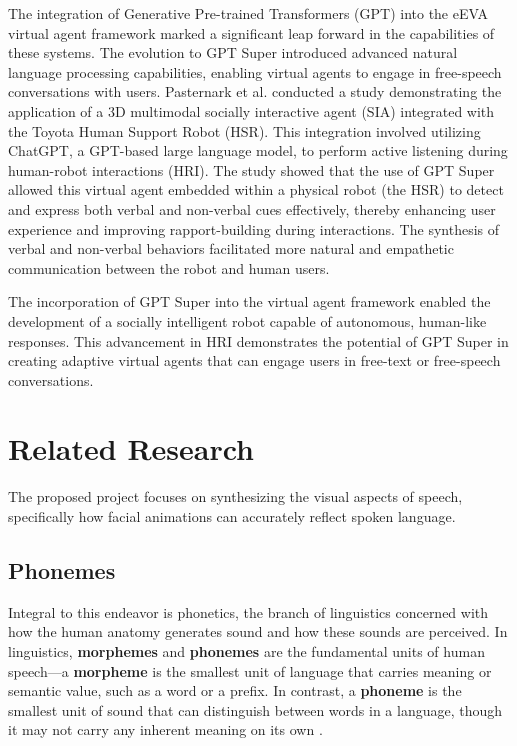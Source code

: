 \documentclass[12pt]{article}
\begin{document}
The integration of Generative Pre-trained Transformers (GPT) into the eEVA virtual agent framework marked a significant leap forward in the capabilities of these systems. The evolution to GPT Super introduced advanced natural language processing capabilities, enabling virtual agents to engage in free-speech conversations with users.  Pasternark et al. \cite{Pasternak20243DListening} conducted a study demonstrating the application of a 3D multimodal socially interactive agent (SIA) integrated with the Toyota Human Support Robot (HSR). This integration involved utilizing ChatGPT, a GPT-based large language model, to perform active listening during human-robot interactions (HRI). The study showed that the use of GPT Super allowed this virtual agent embedded within a physical robot (the HSR) to detect and express both verbal and non-verbal cues effectively, thereby enhancing user experience and improving rapport-building during interactions. The synthesis of verbal and non-verbal behaviors facilitated more natural and empathetic communication between the robot and human users.

The incorporation of GPT Super into the virtual agent framework enabled the development of a socially intelligent robot capable of autonomous, human-like responses. This advancement in HRI demonstrates the potential of GPT Super in creating adaptive virtual agents that can engage users in free-text or free-speech conversations.  

\section{Related Research}
\label{sec:relatedResearch}

 The proposed project focuses on synthesizing the visual aspects of speech, specifically how facial animations can accurately reflect spoken language. 
 
 \subsection{Phonemes} 
 \label{sec:phonemes}
 Integral to this endeavor is phonetics, the branch of linguistics concerned with how the human anatomy generates sound and how these sounds are perceived. In linguistics, \textbf{morphemes} and \textbf{phonemes} are the fundamental units of human speech—a \textbf{morpheme} is the smallest unit of language that carries meaning or semantic value, such as a word or a prefix. In contrast, a \textbf{phoneme} is the smallest unit of sound that can distinguish between words in a language, though it may not carry any inherent meaning on its own \cite{Payack2008AWorld}.
\end{document}
